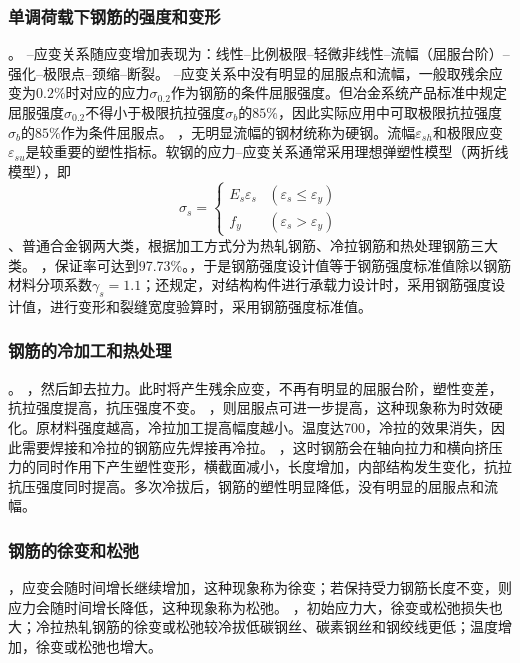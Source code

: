 \documentclass{article}
\newcommand{\gb}{《混凝土结构设计规范》（GB 50010）}
\begin{document}
\subsubsection{单调荷载下钢筋的强度和变形}
。
--应变关系随应变增加表现为：线性--比例极限--轻微非线性--流幅（屈服台阶）--强化--极限点--颈缩--断裂。
--应变关系中没有明显的屈服点和流幅，一般取残余应变为$0.2\%$时对应的应力$\sigma_{0.2}$作为钢筋的条件屈服强度。但冶金系统产品标准中规定屈服强度$\sigma_{0.2}$不得小于极限抗拉强度$\sigma_b$的$85\%$，因此实际应用中可取极限抗拉强度$\sigma_b$的$85\%$作为条件屈服点。
，无明显流幅的钢材统称为硬钢。流幅$\varepsilon_{sh}$和极限应变$\varepsilon_{su}$是较重要的塑性指标。软钢的应力--应变关系通常采用理想弹塑性模型（两折线模型），即
$$
    \sigma_s =
    \left\{ \begin{aligned}
        E_s \varepsilon_s & (\varepsilon_s \leq \varepsilon_y) \\
        f_y               & (\varepsilon_s >\varepsilon_y)
    \end{aligned} \right.
$$
、普通合金钢两大类，根据加工方式分为热轧钢筋、冷拉钢筋和热处理钢筋三大类。
，保证率可达到97.73\%。，于是钢筋强度设计值等于钢筋强度标准值除以钢筋材料分项系数$\gamma_s=1.1$；还规定，对结构构件进行承载力设计时，采用钢筋强度设计值，进行变形和裂缝宽度验算时，采用钢筋强度标准值。
\subsubsection{钢筋的冷加工和热处理}
。
，然后卸去拉力。此时将产生残余应变，不再有明显的屈服台阶，塑性变差，抗拉强度提高，抗压强度不变。
，则屈服点可进一步提高，这种现象称为时效硬化。原材料强度越高，冷拉加工提高幅度越小。温度达700，冷拉的效果消失，因此需要焊接和冷拉的钢筋应先焊接再冷拉。
，这时钢筋会在轴向拉力和横向挤压力的同时作用下产生塑性变形，横截面减小，长度增加，内部结构发生变化，抗拉抗压强度同时提高。多次冷拔后，钢筋的塑性明显降低，没有明显的屈服点和流幅。
\subsubsection{钢筋的徐变和松弛}
，应变会随时间增长继续增加，这种现象称为徐变；若保持受力钢筋长度不变，则应力会随时间增长降低，这种现象称为松弛。
，初始应力大，徐变或松弛损失也大；冷拉热轧钢筋的徐变或松弛较冷拔低碳钢丝、碳素钢丝和钢绞线更低；温度增加，徐变或松弛也增大。
\end{document}
